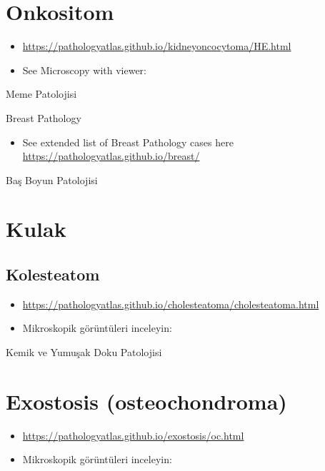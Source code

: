 \documentclass[
  letterpaper,
  DIV=11,
  numbers=noendperiod]{scrreprt}
\providecommand{\tightlist}{%
  \setlength{\itemsep}{0pt}\setlength{\parskip}{0pt}}
\begin{document}
\hypertarget{onkositom}{%
\chapter{Onkositom}\label{onkositom}}

\begin{itemize}
\item
  \url{https://pathologyatlas.github.io/kidneyoncocytoma/HE.html}
\item
  See Microscopy with viewer:
\end{itemize}

Meme Patolojisi

Breast Pathology

\begin{itemize}
\tightlist
\item
  See extended list of Breast Pathology cases here
  \url{https://pathologyatlas.github.io/breast/}
\end{itemize}

Baş Boyun Patolojisi

\hypertarget{kulak}{%
\chapter{Kulak}\label{kulak}}

\hypertarget{kolesteatom}{%
\section{Kolesteatom}\label{kolesteatom}}

\begin{itemize}
\item
  \url{https://pathologyatlas.github.io/cholesteatoma/cholesteatoma.html}
\item
  Mikroskopik görüntüleri inceleyin:
\end{itemize}

Kemik ve Yumuşak Doku Patolojisi

\hypertarget{exostosis-osteochondroma}{%
\chapter{Exostosis (osteochondroma)}\label{exostosis-osteochondroma}}

\begin{itemize}
\item
  \url{https://pathologyatlas.github.io/exostosis/oc.html}
\item
  Mikroskopik görüntüleri inceleyin:
\end{itemize}
\end{document}
